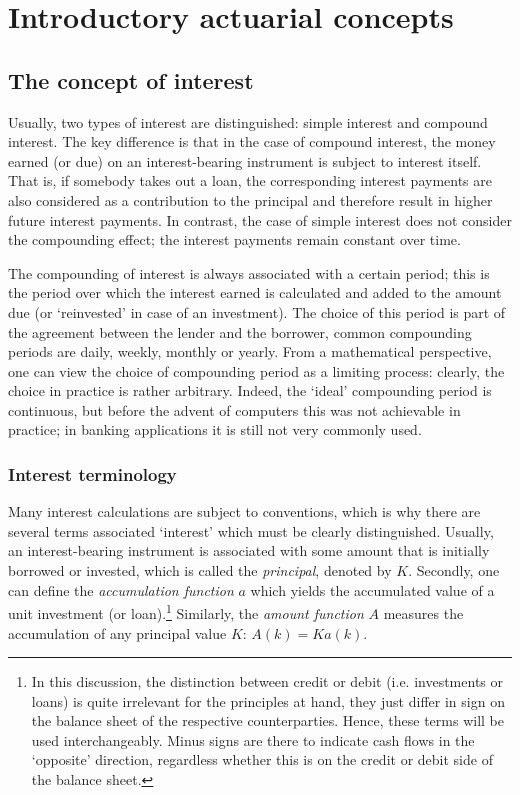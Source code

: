 \chapter{Introductory actuarial concepts}


\section{The concept of interest}


Usually, two types of interest are distinguished: simple interest and compound interest. The key difference is that in the case of compound interest, the money earned (or due) on an interest-bearing instrument is subject to interest itself. That is, if somebody takes out a loan, the corresponding interest payments are also considered as a contribution to the principal and therefore result in higher future interest payments. In contrast, the case of simple interest does not consider the compounding effect; the interest payments remain constant over time. 

The compounding of interest is always associated with a certain period; this is the period over which the interest earned is calculated and added to the amount due (or `reinvested' in case of an investment). The choice of this period is part of the agreement between the lender and the borrower, common compounding periods are daily, weekly, monthly or yearly. From a mathematical perspective, one can view the choice of compounding period as a limiting process: clearly, the choice in practice is rather arbitrary. Indeed, the `ideal' compounding period is continuous, but before the advent of computers this was not achievable in practice; in banking applications it is still not very commonly used. \cite{Zipf2003}

\subsection{Interest terminology}
Many interest calculations are subject to conventions, which is why there are several terms associated `interest' which must be clearly distinguished. Usually, an interest-bearing instrument is associated with some amount that is initially borrowed or invested, which is called the \emph{principal}, denoted by \(K\). Secondly, one can define  the \emph{accumulation function} \(a\) which yields the accumulated value of a unit investment (or loan).\footnote{In this discussion, the distinction between credit or debit (i.e. investments or loans) is quite irrelevant for the principles at hand, they just differ in sign on the balance sheet of the respective counterparties. Hence, these terms will be used interchangeably. Minus signs are there to indicate cash flows in the `opposite' direction, regardless whether this is on the credit or debit side of the balance sheet.}
Similarly, the \emph{amount function} \(A\) measures the accumulation of any principal value \(K\): \(A(k) = Ka(k)\). \cite{Kellison1991}

